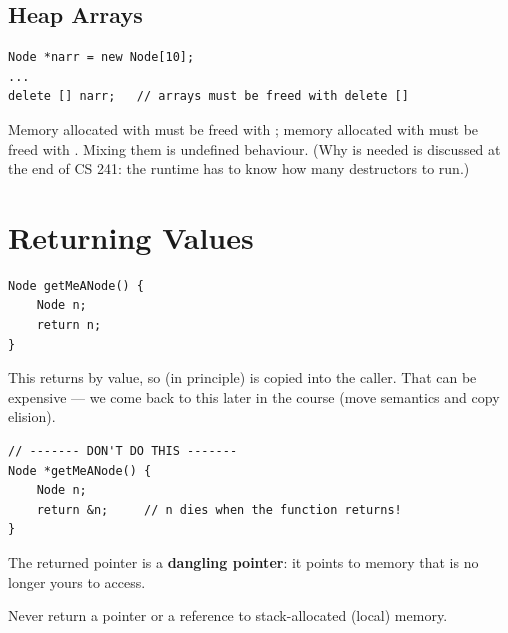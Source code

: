 \subsection{Heap Arrays}
\begin{lstlisting}[style=cpp]
Node *narr = new Node[10];
...
delete [] narr;   // arrays must be freed with delete []
\end{lstlisting}
Memory allocated with  must be freed with ; memory
allocated with  must be freed with . Mixing them is
undefined behaviour. (Why \code{[]} is needed is discussed at the end of CS 241:
the runtime has to know how many destructors to run.)

\section{Returning Values}
\begin{lstlisting}[style=cpp]
Node getMeANode() {
    Node n;
    return n;
}
\end{lstlisting}
This returns by value, so (in principle)  is copied into the caller.
That can be expensive --- we come back to this later in the course (move
semantics and copy elision).

\begin{lstlisting}[style=cpp]
// ------- DON'T DO THIS -------
Node *getMeANode() {
    Node n;
    return &n;     // n dies when the function returns!
}
\end{lstlisting}
The returned pointer is a \textbf{dangling pointer}: it points to memory that is
no longer yours to access.

\begin{center}
\end{center}

\begin{important}[Rule]
Never return a pointer or a reference to stack-allocated (local) memory.
\end{important}

